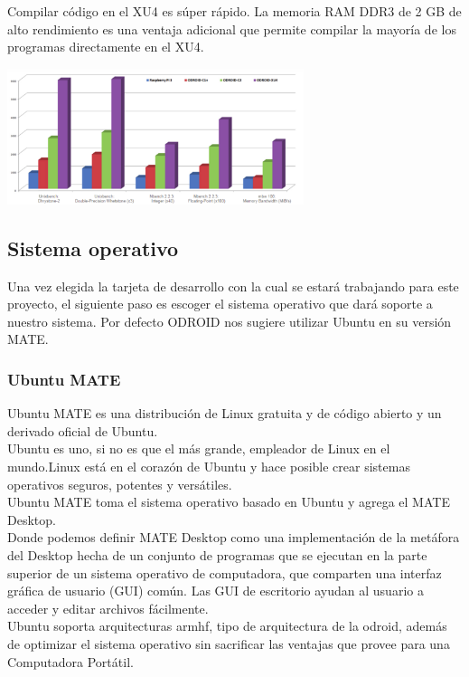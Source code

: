 Compilar código en el XU4 es súper rápido. La memoria RAM DDR3 de 2 GB de
alto rendimiento es una ventaja adicional que permite compilar la mayoría de los
programas directamente en el XU4.\cite{WEB:HK2020}
\begin{center}
	\includegraphics[width=0.65\textwidth]{Contenido/Cuerpo/Capitulo2/Fig6.eps}
	\label{fig:MarcoTeorico:Fig13}
\end{center}


\subsection{Sistema operativo}
Una vez elegida la tarjeta de desarrollo con la cual se estará trabajando para este
proyecto, el siguiente paso es escoger el sistema operativo que dará soporte a nuestro
sistema. Por defecto ODROID nos sugiere utilizar Ubuntu en su versión MATE.
\subsubsection{Ubuntu MATE}
Ubuntu MATE es una distribución de Linux gratuita y de código abierto y un derivado
oficial de Ubuntu.\\
Ubuntu es uno, si no es que el más grande, empleador de Linux en el mundo.Linux está en el
corazón de Ubuntu y hace posible crear sistemas operativos seguros, potentes y versátiles.\\
Ubuntu MATE toma el sistema operativo basado en Ubuntu y agrega el MATE Desktop.\\
Donde podemos definir MATE Desktop como una implementación de la metáfora del Desktop
hecha de un conjunto de programas que se ejecutan en la parte superior de un sistema
operativo de computadora, que comparten una interfaz gráfica de usuario (GUI) común.
Las GUI de escritorio ayudan al usuario a acceder y editar archivos fácilmente.\cite{WEB:Ubuntu}\\
Ubuntu soporta arquitecturas armhf, tipo de arquitectura de la odroid, además de optimizar
el sistema operativo sin sacrificar las ventajas que provee para una Computadora Portátil.

